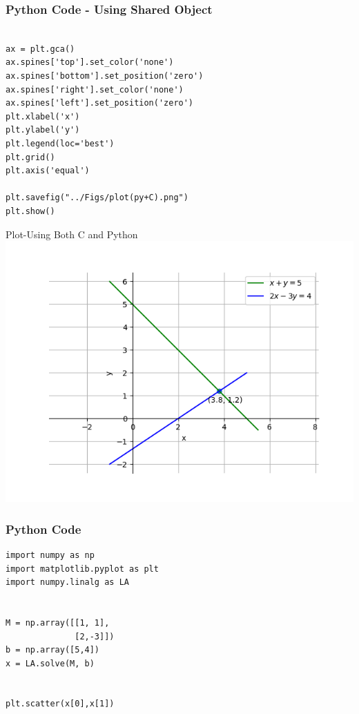 \documentclass{beamer}
\begin{document}
\begin{frame}[fragile]
    \frametitle{Python Code - Using Shared Object}
    \begin{lstlisting}
    
ax = plt.gca()
ax.spines['top'].set_color('none')
ax.spines['bottom'].set_position('zero')
ax.spines['right'].set_color('none')
ax.spines['left'].set_position('zero')
plt.xlabel('x')
plt.ylabel('y')
plt.legend(loc='best')
plt.grid()
plt.axis('equal')

plt.savefig("../Figs/plot(py+C).png")
plt.show()

\end{lstlisting}
\end{frame}


\begin{frame}{Plot-Using Both C and Python}
    \centering
    \includegraphics[width=\columnwidth, height=0.8\textheight, keepaspectratio]{Figs/plot(py+C).png}     
\end{frame}



\begin{frame}[fragile]
    \frametitle{Python Code}
    \begin{lstlisting}
import numpy as np
import matplotlib.pyplot as plt
import numpy.linalg as LA


M = np.array([[1, 1],
              [2,-3]])
b = np.array([5,4])
x = LA.solve(M, b)


plt.scatter(x[0],x[1])


\end{lstlisting}
\end{frame}
\end{document}
